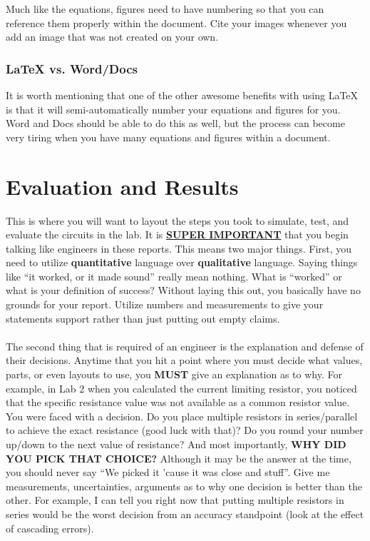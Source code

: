 \documentclass{hitec}
\begin{document}
\noindent
Much like the equations, figures need to have numbering so that you can reference them properly within the document. Cite your images whenever you add an image that was not created on your own.

\subsubsection{\LaTeX \hspace{0ex} vs. Word/Docs}
It is worth mentioning that one of the other awesome benefits with using LaTeX is that it will semi-automatically number your equations and figures for you. Word and Docs should be able to do this as well, but the process can become very tiring when you have many equations and figures within a document. 

\section{Evaluation and Results}
This is where you will want to layout the steps you took to simulate, test, and evaluate the circuits in the lab. It is \textbf{\underline{SUPER IMPORTANT}} that you begin talking like engineers in these reports. This means two major things. First, you need to utilize \textbf{quantitative} language over \textbf{qualitative} language. Saying things like ``it worked, or it made sound'' really mean nothing. What is ``worked'' or what is your definition of success? Without laying this out, you basically have no grounds for your report. Utilize numbers and measurements to give your statements support rather than just putting out empty claims.
\\
\\
\noindent
The second thing that is required of an engineer is the explanation and defense of their decisions. Anytime that you hit a point where you must decide what values, parts, or even layouts to use, you \textbf{MUST} give an explanation as to why. For example, in Lab 2 when you calculated the current limiting resistor, you noticed that the specific resistance value was not available as a common resistor value. You were faced with a decision. Do you place multiple resistors in series/parallel to achieve the exact resistance (good luck with that)? Do you round your number up/down to the next value of resistance? And most importantly, \textbf{WHY DID YOU PICK THAT CHOICE?} Although it may be the answer at the time, you should never say ``We picked it 'cause it was close and stuff''. Give me measurements, uncertainties, arguments as to why one decision is better than the other. For example, I can tell you right now that putting multiple resistors in series would be the worst decision from an accuracy standpoint (look at the effect of cascading errors).
\end{document}
